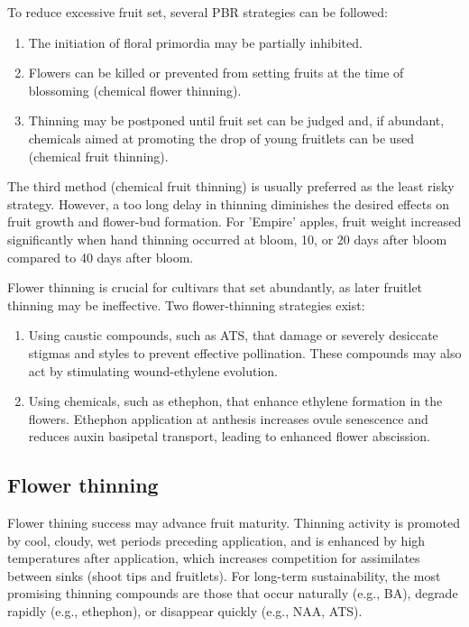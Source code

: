 \vspace{0.5em}
To reduce excessive fruit set, several PBR strategies can be followed: 

\begin{enumerate} 
    \item The initiation of floral primordia may be partially inhibited. \item Flowers can be killed or prevented from setting fruits at the time of blossoming (chemical flower thinning). 
    \item Thinning may be postponed until fruit set can be judged and, if abundant, chemicals aimed at promoting the drop of young fruitlets can be used (chemical fruit thinning). 
\end{enumerate} 

\vspace{0.5em}
The third method (chemical fruit thinning) is usually preferred as the least risky strategy. However, a too long delay in thinning diminishes the desired effects on fruit growth and flower-bud formation. For 'Empire' apples, fruit weight increased significantly when hand thinning occurred at bloom, 10, or 20 days after bloom compared to 40 days after bloom.

\vspace{0.5em}
Flower thinning is crucial for cultivars that set abundantly, as later fruitlet thinning may be ineffective. Two flower-thinning strategies exist: 

\begin{enumerate} 
    \item Using caustic compounds, such as ATS, that damage or severely desiccate stigmas and styles to prevent effective pollination. These compounds may also act by stimulating wound-ethylene evolution. 
    \item Using chemicals, such as ethephon, that enhance ethylene formation in the flowers. Ethephon application at anthesis increases ovule senescence and reduces auxin basipetal transport, leading to enhanced flower abscission. 
\end{enumerate} 

\vspace{0.5em}
\subsection*{Flower thinning} 
Flower thining success may advance fruit maturity. Thinning activity is promoted by cool, cloudy, wet periods preceding application, and is enhanced by high temperatures after application, which increases competition for assimilates between sinks (shoot tips and fruitlets). For long-term sustainability, the most promising thinning compounds are those that occur naturally (e.g., BA), degrade rapidly (e.g., ethephon), or disappear quickly (e.g., NAA, ATS).


